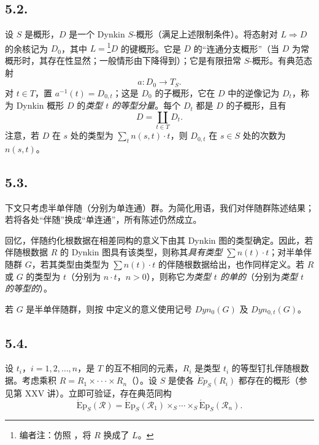 \subsection*{5.2.}
设 \(S\) 是概形，\(D\) 是一个 Dynkin \(S\)-概形（满足上述限制条件）。将态射对 \(L \Rightarrow D\) 的余核记为 \(D_0\)，其中 \(L =\)\footnote{编者注：仿照 ，将 \(R\) 换成了 \(L\)。}\(D\) 的键概形。它是 \(D\) 的“连通分支概形”（当 \(D\) 为常概形时，其存在性显然；一般情形由下降得到）；它是有限扭常 \(S\)-概形。有典范态射
\[ a : D_{0} \to T_{S}. \]
对 \(t \in T\)，置 \(a^{-1}(t) = D_{0, t}\)；这是 \(D_0\) 的子概形，它在 \(D\) 中的逆像记为 \(D_{t}\)，称为 Dynkin 概形 \(D\) 的\emph{类型 \(t\) 的等型分量}。每个 \(D_{t}\) 都是 \(D\) 的子概形，且有
\[
  D=\coprod_{t\in T}D_t.
\]
注意，若 \(D\) 在 \(s\) 处的类型为 \(\sum_{t} n(s, t) \cdot t\)，则 \(D_{0, t}\) 在 \(s \in S\) 处的次数为 \(n(s, t)\)。

\subsection*{5.3.}
下文只考虑半单伴随（分别为单连通）群。为简化用语，我们对伴随群陈述结果；若将各处“伴随”换成“单连通”，所有陈述仍然成立。

回忆，伴随约化根数据在相差同构的意义下由其 Dynkin 图的类型确定。因此，若伴随根数据 \(R\) 的 Dynkin 图具有该类型，则称其\emph{具有类型 \(\sum n(t) \cdot t\)}；对半单伴随群 \(G\)，若其类型由类型为 \(\sum n(t) \cdot t\) 的伴随根数据给出，也作同样定义。若 \(R\) 或 \(G\) 的类型为 \(t\)（分别为 \(n \cdot t\)，\(n > 0\)），则称它\emph{为类型 \(t\) 的单的}（分别为\emph{类型 \(t\) 的等型的}）。

若 \(G\) 是半单伴随群，则按  中定义的意义使用记号 \(Dyn_{0}(G)\) 及 \(Dyn_{0, t}(G)\)。

\subsection*{5.4.}
设 \(t_i\)，\(i=1,2,\ldots,n\)，是 \(T\) 的互不相同的元素，\(R_i\) 是类型 \(t_{i}\) 的等型钉扎伴随根数据。考虑乘积 \(R = R_{1} \times \cdot\cdot\cdot \times R_{n}\)（）。设 \(S\) 是使各 \(\acute{E}p_{S}(R_{i})\) 都存在的概形（参见第 XXV 讲）。立即可验证，存在典范同构
\[
  \tag{*}\label{sga3:xxiv:subsection:5-4:equation:star}
  \operatorname{\acute{E}p}_S(\mathscr R)
  =
  \operatorname{\acute{E}p}_S(\mathscr R_1)
  \times_S\cdots\times_S
  \operatorname{\acute{E}p}_S(\mathscr R_n).
\]

